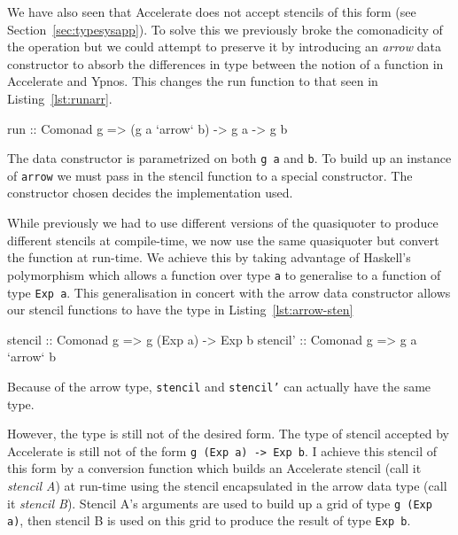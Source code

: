 \documentclass[12pt,a4paper,twoside]{scrbook}
\begin{document}
We have also seen that Accelerate does not accept stencils of this form (see
Section~\ref{sec:typesysapp}).  To solve this we previously broke the
comonadicity of the operation but we could attempt to preserve it by introducing
an \emph{arrow} data constructor to absorb the differences in type between the
notion of a function in Accelerate and Ypnos. This changes the run function to
that seen in Listing~\ref{lst:runarr}.

\begin{hflisting}[label={lst:runarr}, caption=The type run is generalised to
  using the \texttt{arrow} type.]
run :: Comonad g => (g a `arrow` b) -> g a -> g b
\end{hflisting}

The data constructor is parametrized on both \texttt{g a} and
\texttt{b}. To build up an instance of \texttt{arrow} we must pass in the
stencil function to a special constructor. The constructor chosen
decides the implementation used.

While previously we had to use different versions of the quasiquoter to
produce different stencils at compile-time, we now use the same
quasiquoter but convert the function at run-time. We achieve this by
taking advantage of Haskell's polymorphism which allows a function over
type \texttt{a} to generalise to a function of type \texttt{Exp a}. This
generalisation in concert with the arrow data constructor allows our
stencil functions to have the type in Listing~\ref{lst:arrow-sten}

\begin{hflisting}[label={lst:arrow-sten}, caption=Here we see the type the
  stencil must have in Accelerate (\texttt{stencil}) and the type we can
  generalise to using the \texttt{arrow} type (\texttt{stencil'}).]
stencil :: Comonad g => g (Exp a) -> Exp b
stencil' :: Comonad g => g a `arrow` b
\end{hflisting}

Because of the arrow type, \texttt{stencil} and \texttt{stencil'} can
actually have the same type.

However, the type is still not of the desired form. The type of stencil accepted
by Accelerate is still not of the form \texttt{g (Exp a) -\textgreater{} Exp
  b}. I achieve this stencil of this form by a conversion function which builds
an Accelerate stencil (call it \emph{stencil A}) at run-time using the stencil
encapsulated in the arrow data type (call it \emph{stencil B}). Stencil A's
arguments are used to build up a grid of type \texttt{g (Exp a)}, then stencil B
is used on this grid to produce the result of type \texttt{Exp b}.
\end{document}
